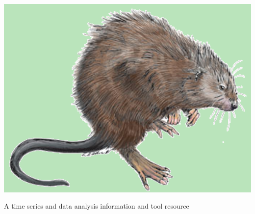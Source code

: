 \documentclass[serif]{beamer}\usepackage[]{graphicx}\usepackage[]{color}
\begin{document}
\begin{frame}{\includegraphics[width=0.05\paperwidth]{fig/muskrat.png}\hspace{0.07in}{\bf SWMPrats.net}}
\centerline{A time series and data analysis information and tool resource} \\~\\
\centerline{}
\end{frame}
\end{document}
